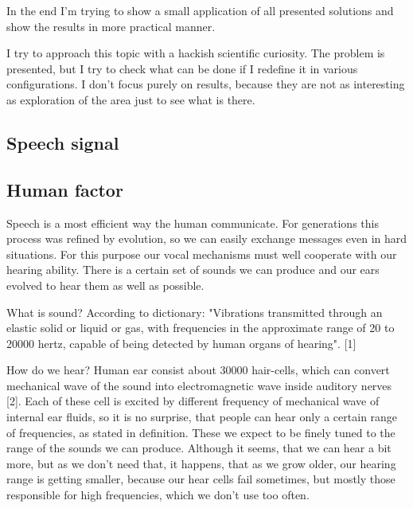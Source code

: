 \documentclass[12pt,a4paper,english]{article}
\begin{document}
In the end I'm trying to show a small application of all presented solutions and show the results in more practical manner. \newline

I try to approach this topic with a hackish scientific curiosity. The problem is presented, but I try to check what can be done if I redefine it in various configurations. I don't focus purely on results, because they are not as interesting as exploration of the area just to see what is there.


\newpage
\begin{center}
    \section{Speech signal}
\end {center}
\subsection{Human factor}

Speech is a most efficient way the human communicate. For generations this process was refined by evolution, so we can easily exchange messages even in hard situations. For this purpose our vocal mechanisms must well cooperate with our hearing ability. There is a certain set of sounds we can produce and our ears evolved to hear them as well as possible.\newline 

What is sound? According to dictionary: "Vibrations transmitted through an elastic solid or liquid or gas, with frequencies in the approximate range of 20 to 20000 hertz, capable of being detected by human organs of hearing". [1]\newline

How do we hear? Human ear consist about 30000 hair-cells, which can convert mechanical wave of the sound into electromagnetic wave inside auditory nerves [2]. 
Each of these cell is excited by different frequency of mechanical wave of internal ear fluids, so it is no surprise, that people can hear only a certain range of frequencies, as stated in definition. These we expect to be finely tuned to the range of the sounds we can produce. Although it seems, that we can hear a bit more, but as we don't need that, it happens, that as we grow older, our hearing range is getting smaller, because our hear cells fail sometimes, but mostly those responsible for high frequencies, which we don't use too often.\newline
\end{document}
